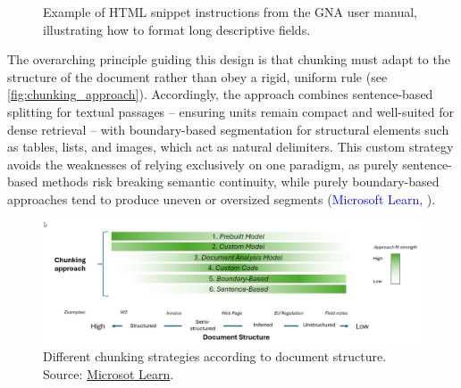 \begin{spacing}{1.5}
\begin{figure}[H]
  \centering
  \caption{Example of HTML snippet instructions from the GNA user manual, illustrating how to format long descriptive fields.}
  \label{fig:html_example}
\end{figure}

The overarching principle guiding this design is that chunking must adapt to the structure of the document rather than obey a rigid, uniform rule (see \autoref{fig:chunking_approach}). Accordingly, the approach combines sentence-based splitting for textual passages -- ensuring units remain compact and well-suited for dense retrieval -- with boundary-based segmentation for structural elements such as tables, lists, and images, which act as natural delimiters. This custom strategy avoids the weaknesses of relying exclusively on one paradigm, as purely sentence-based methods risk breaking semantic continuity, while purely boundary-based approaches tend to produce uneven or oversized segments (\textcolor{blue}{Microsoft Learn,} \citeyear{noauthor_develop_2025}).

\vspace{0.8em}
\begin{figure}[H]
  \centering
  \includegraphics[width=\textwidth]{images/chunking-approaches-by-document-structure.png} 
  \caption{Different chunking strategies according to document structure.\\
  \footnotesize{Source: \href{https://web.archive.org/web/20250825093743/https://learn.microsoft.com/en-us/azure/architecture/ai-ml/guide/rag/rag-chunking-phase}{Microsot Learn}}.}
  \label{fig:chunking_approach}
\end{figure}


\end{spacing}
